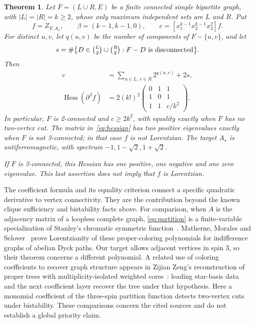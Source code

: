 \documentclass[11pt]{article}
\newtheorem{theorem}{Theorem}
\DeclareMathOperator{\Hess}{Hess}
\begin{document}
\begin{theorem}\label{thm:main}
Let $F=(L\cup R,E)$ be a finite connected simple bipartite graph, with
$|L|=|R|=k\ge2$, whose only maximum independent sets are $L$ and $R$.
Put
\[
 f=Z_{F,A_\star},\qquad \beta=(k-1,k-1,0),\qquad
 c=[x_1^{k-1}x_2^{k-1}x_3^2]f.
\]
For distinct $u,v$, let $q(u,v)$ be the number of components of
$F-\{u,v\}$, and let
\[
 s=\#\bigl\{D\in\tbinom{L}{2}\cup\tbinom{R}{2}:F-D
       \text{ is disconnected}\bigr\}.
\]
Then
\begin{align}
 c&=\sum_{u\in L,\,v\in R}2^{q(u,v)}+2s,\label{eq:coefficient}\\
 \Hess(\partial^\beta f)
   &=2(k!)^2\begin{pmatrix}0&1&1\\1&0&1\\1&1&c/k^2\end{pmatrix}.
       \label{eq:hessian}
\end{align}
In particular, $F$ is 2-connected and $c\ge2k^2$, with equality exactly
when $F$ has no two-vertex cut. The matrix in~\eqref{eq:hessian} has
two positive eigenvalues exactly when $F$ is not 3-connected; in that
case $f$ is not Lorentzian. The target $A_\star$ is antiferromagnetic,
with spectrum $-1,1-\sqrt2,1+\sqrt2$.

If $F$ is 3-connected, this Hessian has one positive, one negative and
one zero eigenvalue. This last assertion does not imply that $f$ is Lorentzian.
\end{theorem}

The coefficient formula and its equality criterion connect a specific
quadratic derivative to vertex connectivity. They are the contribution
beyond the known clique sufficiency and bistability facts above. For
comparison, when $A$ is the adjacency matrix of a loopless complete graph,
\eqref{eq:partition} is a finite-variable specialization of Stanley's
chromatic symmetric function~\cite{Stanley}. Matherne, Morales and
Selover~\cite[Theorem~1.5]{MMS} prove Lorentzianity of these proper-coloring
polynomials for indifference graphs of abelian Dyck paths. Our target
allows adjacent vertices in spin 3, so their theorem concerns a different
polynomial. A related use of coloring coefficients to recover graph
structure appears in Zijian Zeng's reconstruction of proper trees with
multiplicity-isolated weighted cores~\cite[Theorem~1.1]{Zeng}: leading
star-basis data and the next coefficient layer recover the tree under
that hypothesis. Here a monomial coefficient of the three-spin partition
function detects two-vertex cuts under bistability. These comparisons
concern the cited sources and do not establish a global priority claim.
\end{document}

